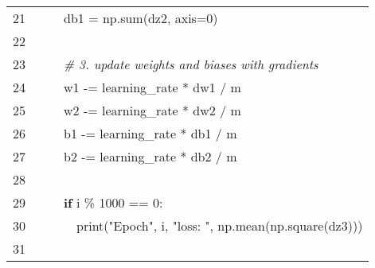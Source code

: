 \documentclass[preprint,12pt]{elsarticle}
\begin{document}
\begin{table}[ht]
{\begin{tabular}{|r l l l l|}
            \rowcolor{regularback} \cellcolor{linenumberback} \textcolor{grayhighlight}{21} & & & \multicolumn{2}{l|}{db1 \textcolor{grayhighlight}{=} np\textcolor{grayhighlight}{.}sum(dz2, axis\textcolor{grayhighlight}{=0})} \\
            \rowcolor{regularback} \cellcolor{linenumberback} \textcolor{grayhighlight}{22} & \multicolumn{4}{l|}{} \\
            \rowcolor{regularback} \cellcolor{linenumberback} \textcolor{grayhighlight}{23} & & & \multicolumn{2}{l|}{\textcolor{commentblue}{\textit{\# 3. update weights and biases with gradients}}} \\
            \rowcolor{regularback} \cellcolor{linenumberback} \textcolor{grayhighlight}{24} & & & \multicolumn{2}{l|}{w1 \textcolor{grayhighlight}{-=} learning\_rate \textcolor{grayhighlight}{*} dw1 \textcolor{grayhighlight}{/} m} \\
            \rowcolor{regularback} \cellcolor{linenumberback} \textcolor{grayhighlight}{25} & & & \multicolumn{2}{l|}{w2 \textcolor{grayhighlight}{-=} learning\_rate \textcolor{grayhighlight}{*} dw2 \textcolor{grayhighlight}{/} m} \\
            \rowcolor{regularback} \cellcolor{linenumberback} \textcolor{grayhighlight}{26} & & & \multicolumn{2}{l|}{b1 \textcolor{grayhighlight}{-=} learning\_rate \textcolor{grayhighlight}{*} db1 \textcolor{grayhighlight}{/} m} \\
            \rowcolor{regularback} \cellcolor{linenumberback} \textcolor{grayhighlight}{27} & & & \multicolumn{2}{l|}{b2 \textcolor{grayhighlight}{-=} learning\_rate \textcolor{grayhighlight}{*} db2 \textcolor{grayhighlight}{/} m} \\
            \rowcolor{regularback} \cellcolor{linenumberback} \textcolor{grayhighlight}{28} & \multicolumn{4}{l|}{} \\
            \rowcolor{regularback} \cellcolor{linenumberback} \textcolor{grayhighlight}{29} & & & \multicolumn{2}{l|}{\textcolor{codegreen}{\textbf{if}} i \textcolor{grayhighlight}{\% 1000 == 0}:} \\
            \rowcolor{regularback} \cellcolor{linenumberback} \textcolor{grayhighlight}{30} & & & & \textcolor{codegreen}{print}(\textcolor{codered}{"Epoch"}, i, \textcolor{codered}{"loss: "}, np\textcolor{grayhighlight}{.}mean(np\textcolor{grayhighlight}{.}square(dz3))) \\
            \rowcolor{regularback} \cellcolor{linenumberback} \textcolor{grayhighlight}{31} & \multicolumn{4}{l|}{} \\

\end{tabular}}
\end{table}
\end{document}
